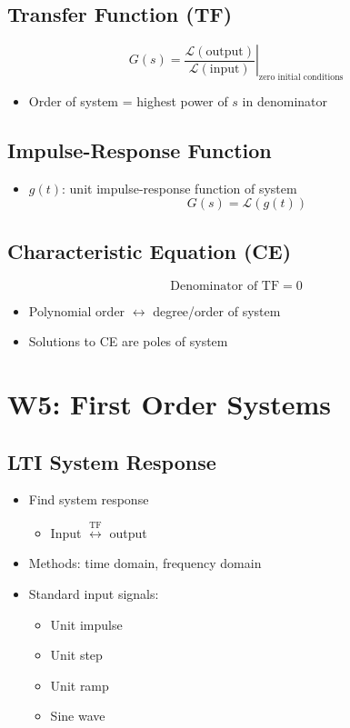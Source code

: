 \documentclass[a4paper]{article}
\begin{document}
\subsection{Transfer Function (TF)}
$$G(s) = \left.\frac{\mathscr{L}(\text{output})}{\mathscr{L}(\text{input})}\right|_\text{zero initial conditions}$$
\begin{itemize}
    \item Order of system = highest power of $s$ in denominator
\end{itemize}
\subsection{Impulse-Response Function}
\begin{itemize}
    \item $g(t)$: unit impulse-response function of system
    $$G(s) = \mathscr{L}(g(t))$$
\end{itemize}
\subsection{Characteristic Equation (CE)}
$$\text{Denominator of TF} = 0$$
\begin{itemize}
    \item Polynomial order $\leftrightarrow$ degree/order of system
    \item Solutions to CE are poles of system
\end{itemize}
\section{W5: First Order Systems}
\subsection{LTI System Response}
\begin{itemize}
    \item Find system response
    \begin{itemize}[label=$\circ$]
        \item Input $\stackrel{\mathrm{TF}}{\longleftrightarrow}$ output
    \end{itemize}
    \item Methods: time domain, frequency domain
    \item Standard input signals:
    \begin{itemize}[label=$\circ$]
        \item Unit impulse
        \item Unit step
        \item Unit ramp
        \item Sine wave
    \end{itemize}
\end{itemize}
\end{document}
